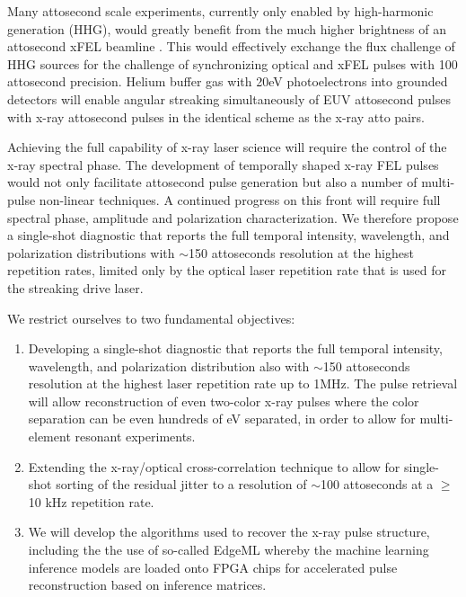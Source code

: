 Many attosecond scale experiments, currently only enabled by high-harmonic generation (HHG)\cite{Lewenstein1994,Hentschel2001,Chen2014,Schmidt2016}, would greatly benefit from the much higher brightness of an attosecond xFEL beamline \cite{Ding2009,Xiang2009}.
This would effectively exchange the flux challenge of HHG sources for the challenge of synchronizing optical and xFEL pulses with 100 attosecond precision.
Helium buffer gas with 20eV photoelectrons into grounded detectors will enable angular streaking simultaneously of EUV attosecond pulses with x-ray attosecond pulses in the identical scheme as the x-ray atto pairs.

Achieving the full capability of x-ray laser science will require the control of the x-ray spectral phase.
The development of temporally shaped x-ray FEL pulses would not only facilitate attosecond pulse generation but also a number of multi-pulse non-linear techniques.
A continued progress on this front \cite{Lutman13_twocolor,Marinelli13_twocolor,Allaria2014,Marinelli2015,Prince2016,Lutman2016,Marinelli2016} will require full spectral phase, amplitude and polarization characterization. 
We therefore propose a single-shot diagnostic that reports the full temporal intensity, wavelength, and polarization distributions with $\sim$150 attoseconds resolution at the highest repetition rates, limited only by the optical laser repetition rate that is used for the streaking drive laser.

We restrict ourselves to two fundamental objectives:
\begin{enumerate}
\item \label{obj::streaking} Developing a single-shot diagnostic that reports the full temporal intensity, wavelength, and polarization distribution also with $\sim$150 attoseconds resolution at the highest laser repetition rate up to 1MHz.  
The pulse retrieval will allow reconstruction of even two-color x-ray pulses where the color separation can be even hundreds of eV separated, in order to allow for multi-element resonant experiments.
\item \label{obj::euv-xray} Extending the x-ray/optical cross-correlation technique to allow for single-shot sorting of the residual jitter to a resolution of $\sim$100 attoseconds at a $\geq$10 kHz repetition rate.
\item \label{obj::ml} We will develop the algorithms used to recover the x-ray pulse structure, including the the use of so-called EdgeML whereby the machine learning inference models are loaded onto FPGA chips for accelerated pulse reconstruction based on inference matrices.
\end{enumerate}

